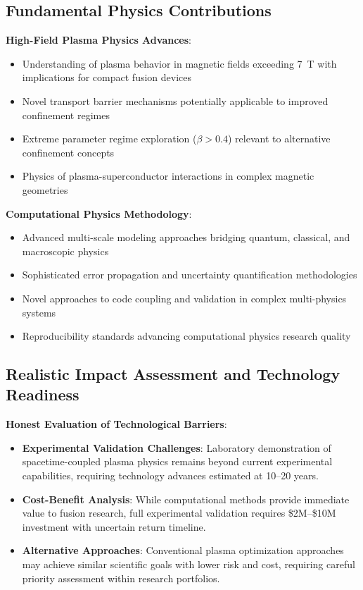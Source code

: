 \documentclass[12pt,a4paper]{article}
\begin{document}
\subsection{Fundamental Physics Contributions}

\textbf{High-Field Plasma Physics Advances}:
\begin{itemize}
\item Understanding of plasma behavior in magnetic fields exceeding 7~T with implications for compact fusion devices
\item Novel transport barrier mechanisms potentially applicable to improved confinement regimes
\item Extreme parameter regime exploration ($\beta > 0.4$) relevant to alternative confinement concepts
\item Physics of plasma-superconductor interactions in complex magnetic geometries
\end{itemize}

\textbf{Computational Physics Methodology}:
\begin{itemize}
\item Advanced multi-scale modeling approaches bridging quantum, classical, and macroscopic physics
\item Sophisticated error propagation and uncertainty quantification methodologies
\item Novel approaches to code coupling and validation in complex multi-physics systems
\item Reproducibility standards advancing computational physics research quality
\end{itemize}

\subsection{Realistic Impact Assessment and Technology Readiness}

\textbf{Honest Evaluation of Technological Barriers}:
\begin{itemize}
\item \textbf{Experimental Validation Challenges}: Laboratory demonstration of spacetime-coupled plasma physics remains beyond current experimental capabilities, requiring technology advances estimated at 10--20 years.
\item \textbf{Cost-Benefit Analysis}: While computational methods provide immediate value to fusion research, full experimental validation requires \$2M--\$10M investment with uncertain return timeline.
\item \textbf{Alternative Approaches}: Conventional plasma optimization approaches may achieve similar scientific goals with lower risk and cost, requiring careful priority assessment within research portfolios.
\end{itemize}
\end{document}
